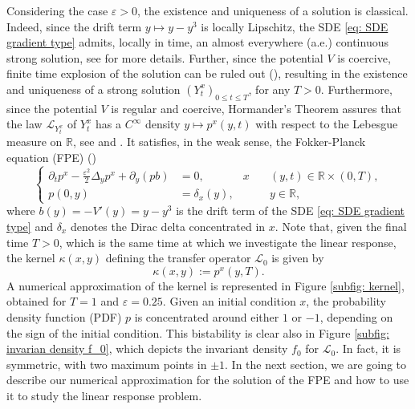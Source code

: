\documentclass{amsart}
\begin{document}
Considering the case $\varepsilon>0$, the existence and uniqueness of a solution is classical. Indeed, since the drift term $y \mapsto y - y^3$ is locally Lipschitz, the SDE \eqref{eq: SDE gradient type} admits, locally in time, an almost everywhere (a.e.) continuous strong solution, see \cite{Baldi2017} for more details. Further, since the potential $V$ is coercive, finite time explosion of the solution can be ruled out (\cite[Theorem 3.5]{Mao1997}), resulting in the existence and uniqueness of a strong solution $(Y_t^x)_{0 \leq t \leq T}$, for any $T>0$. Furthermore, since the potential $V$ is regular and coercive, Hormander's Theorem assures that the law $\mathcal{L}_{Y_t^x}$ of $Y_t^x$ has a $C^\infty$ density $y \mapsto p^x(y,t)$ with respect to the Lebesgue measure on $\mathbb{R}$, see \cite{Hormander1967} and \cite[Section 7]{Hairer2010}. It satisfies, in the weak sense, the Fokker-Planck equation (FPE) (\cite{Risken1984,Otto1998, Gardiner2009})
\begin{equation}
\left \lbrace
\begin{aligned}
     \partial_t p^x  -\frac{\varepsilon^2}{2} \Delta_y p^x + \partial_y \left( pb\right) &= 0, &x\quad &(y,t) \in  \mathbb{R} \times (0,T), \\
    p(0,y) & = \delta_x (y), &\quad & y \in \mathbb{R}, 
\end{aligned}
\right. 
\label{eq: fpe}
\end{equation}
where $b(y) = - V'(y) = y-y^3$ is the drift term  of the SDE \eqref{eq: SDE gradient type} and $\delta_x$ denotes the Dirac delta concentrated in $x$. Note that, given the final time $T>0$, which is the same time at which we investigate the linear response, the kernel $\kappa(x,y)$ defining the transfer operator $\mathcal{L}_0$ is given by
$$
\kappa(x,y) := p^x(y,T).
$$
A numerical approximation of the kernel is represented in Figure \ref{subfig: kernel}, obtained for $T = 1$ and $ \varepsilon = 0.25$. Given an initial condition $x$, the probability density function (PDF) $p$ is concentrated around either $1$ or $-1$, depending on the sign of the initial condition. This bistability is clear also in Figure \ref{subfig: invarian density f_0}, which depicts the invariant density $f_0$ for $\mathcal{L}_0$. In fact, it is symmetric, with two maximum points in $\pm 1$. In the next section, we are going to describe our numerical approximation for the solution of the FPE and how to use it to study the linear response problem.
\end{document}
